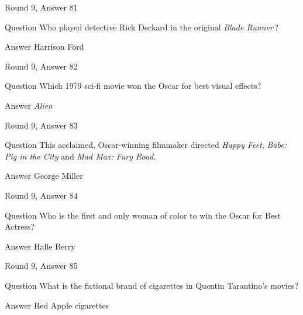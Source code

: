 \documentclass[11pt]{beamer}
\begin{document}
\begin{frame}[t]{Round 9, Answer 81}
\vspace{2em}
\begin{block}{Question}
Who played detective Rick Deckard in the original \emph{Blade Runner}\,?
\end{block}
\pause{}
\begin{block}{Answer}
Harrison Ford
\end{block}
\end{frame}
    

\begin{frame}[t]{Round 9, Answer 82}
\vspace{2em}
\begin{block}{Question}
Which 1979 sci-fi movie won the Oscar for best visual effects?
\end{block}
\pause{}
\begin{block}{Answer}
\emph{Alien}
\end{block}
\end{frame}
    

\begin{frame}[t]{Round 9, Answer 83}
\vspace{2em}
\begin{block}{Question}
This acclaimed, Oscar-winning filmmaker directed \emph{Happy Feet}, \emph{Babe: Pig in the City} and \emph{Mad Max: Fury Road}.
\end{block}
\pause{}
\begin{block}{Answer}
George Miller
\end{block}
\end{frame}
    

\begin{frame}[t]{Round 9, Answer 84}
\vspace{2em}
\begin{block}{Question}
Who is the first and only woman of color to win the Oscar for Best Actress?
\end{block}
\pause{}
\begin{block}{Answer}
Halle Berry
\end{block}
\end{frame}
    

\begin{frame}[t]{Round 9, Answer 85}
\vspace{2em}
\begin{block}{Question}
What is the fictional brand of cigarettes in Quentin Tarantino's movies?
\end{block}
\pause{}
\begin{block}{Answer}
Red Apple cigarettes
\end{block}
\end{frame}
    
\end{document}
